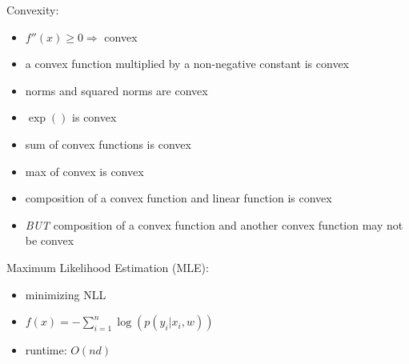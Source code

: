 \documentclass[10pt,landscape,a4paper]{article}
\begin{document}
\begin{multicols*}{5}
Convexity:
\begin{itemize}
    \item \(f''(x) \geq 0 \Rightarrow \) convex
    \item a convex function multiplied by a non-negative constant is convex
    \item norms and squared norms are convex
    \item \(\exp()\) is convex
    \item sum of convex functions is convex
    \item max of convex is convex
    \item composition of a convex function and linear function is convex
    \item \emph{BUT} composition of a convex function and another convex function may not be convex
\end{itemize}
Maximum Likelihood Estimation (MLE):
\begin{itemize}
    \item minimizing NLL
    \item \(f(x) = - \sum_{i=1}^{n}\log{(p(y_i|x_i,w))}\)
    \item runtime: \(O(nd)\)
\end{itemize}


\end{multicols*}
\end{document}
